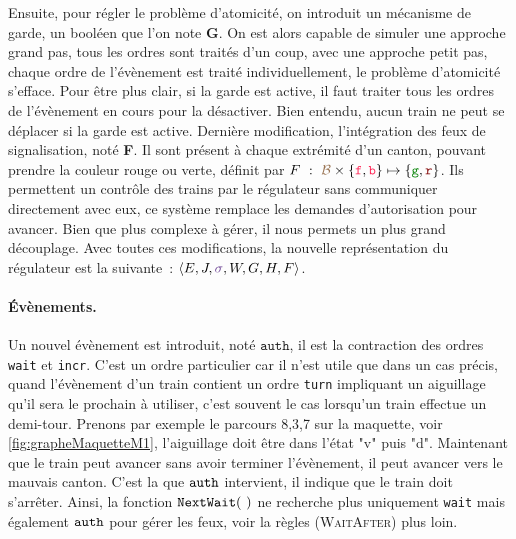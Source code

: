 \documentclass[oneside, a4paper, 11pt]{book}
\newcommand{\ruleFmt}[1]{\textsc{(#1)}}
\newcommand{\ruleDef}[1]{\hypertarget{#1}{\ruleFmt{#1}}}
\newcommand{\forward}{\ensuremath{\mathtt{f}}}
\newcommand{\backward}{\ensuremath{\mathtt{b}}}
\newcommand{\dirFmt}[1]{{\color{dircolor} #1}}
\newcommand{\dirForward}{\ensuremath{\dirFmt{\forward}}}
\newcommand{\dirBackward}{\ensuremath{\dirFmt{\backward}}}
\newcommand{\posFmt}[1]{{\color{poscolor}{#1}}}
\newcommand{\authOrder}{{\mbox{\ensuremath{\mathtt{auth}}}}}
\newcommand{\swFmt}[1]{{\color{swcolor}{#1}}}
\newcommand{\sigred}{{\mbox{${\color{red!50!black}\mathtt{r}}$}}}
\newcommand{\siggreen}{{\mbox{${\color{green!50!black}\mathtt{g}}$}}}
\newcommand{\nextWait}[1]{\ensuremath{{\tt NextWait}(#1)}}
\newcommand{\regM}[7]{\langle #1, #2, #3, #4, #5, #6, #7 \rangle}
\begin{document}
\noindent
Ensuite, pour régler le problème d'atomicité, on introduit un mécanisme de garde, un booléen que l'on note \textbf{G}. On est alors capable de simuler une approche grand pas, tous les ordres sont traités d'un coup, avec une approche petit pas, chaque ordre de l'évènement est traité individuellement, le problème d'atomicité s'efface.
Pour être plus clair, si la garde est active, il faut traiter tous les ordres de l'évènement en cours pour la désactiver. Bien entendu, aucun train ne peut se déplacer si la garde est active.
Dernière modification, l'intégration des feux de signalisation, noté \textbf{F}. Il sont présent à chaque extrémité d'un canton, pouvant prendre la couleur rouge ou verte, définit par $F~:~\posFmt{\mathcal{B}} \times \{\dirForward,\dirBackward\} \mapsto \{\siggreen, \sigred\}$. Ils permettent un contrôle des trains par le régulateur sans communiquer directement avec eux, ce système remplace les demandes d'autorisation pour avancer. Bien que plus complexe à gérer, il nous permets un plus grand découplage.
Avec toutes ces modifications, la nouvelle représentation du régulateur est la suivante~: $\regM{E}{J}{\swFmt{\sigma}}{W}{G}{H}{F}$.


\paragraph{Évènements.}
Un nouvel évènement est introduit, noté \authOrder, il est la contraction des ordres \texttt{wait} et \texttt{incr}. C'est un ordre particulier car il n'est utile que dans un cas précis, quand l'évènement d'un train contient un ordre \texttt{turn} impliquant un aiguillage qu'il sera le prochain à utiliser, c'est souvent le cas lorsqu'un train effectue un demi-tour. Prenons par exemple le parcours 8,3,7 sur la maquette, voir \ref{fig:grapheMaquetteM1}, l'aiguillage doit être dans l'état "v" puis "d".
Maintenant que le train peut avancer sans avoir terminer l'évènement, il peut avancer vers le mauvais canton. C'est la que $\authOrder$ intervient, il indique que le train doit s'arrêter. Ainsi, la fonction \nextWait{~} ne recherche plus uniquement \texttt{wait} mais également $\authOrder$ pour gérer les feux, voir la règles \ruleDef{WaitAfter} plus loin.
\end{document}
